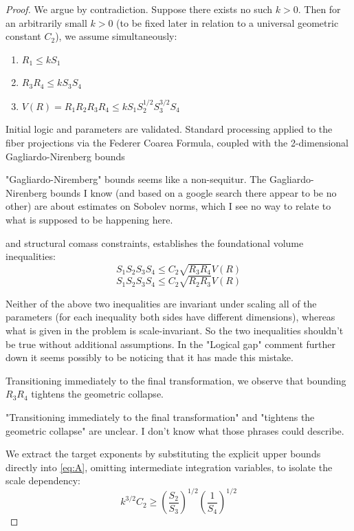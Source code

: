 \documentclass[12pt]{article}
\newcommand{\review}[1]{\begin{reviewbox}#1\end{reviewbox}}
\begin{document}
\begin{proof}
We argue by contradiction. Suppose there exists no such $k > 0$. Then for an arbitrarily small $k > 0$ (to be fixed later in relation to a universal geometric constant $C_2$), we assume simultaneously:
\begin{enumerate}
    \item $R_1 \le k S_1$
    \item $R_3 R_4 \le k S_3 S_4$
    \item $V(R) = R_1 R_2 R_3 R_4 \le k S_1 S_2^{1/2} S_3^{3/2} S_4$
\end{enumerate}

Initial logic and parameters are validated. Standard processing applied to the fiber projections via the Federer Coarea Formula, coupled with the 2-dimensional Gagliardo-Nirenberg bounds \review{"Gagliardo-Niremberg" bounds seems like a non-sequitur.  The Gagliardo-Nirenberg bounds I know (and based on a google search there appear to be no other) are about estimates on Sobolev norms, which I see no way to relate to what is supposed to be happening here.}  and structural comass constraints, establishes the foundational volume inequalities:
\begin{equation}
    S_1 S_2 S_3 S_4 \le C_2 \sqrt{R_3 R_4} V(R) \label{eq:A}
\end{equation}
\begin{equation}
    S_1 S_2 S_3 S_4 \le C_2 \sqrt{R_2 R_3} V(R) \label{eq:B}
\end{equation}

\review{Neither of the above two inequalities are invariant under scaling all of the parameters (for each inequality both sides have different dimensions), whereas what is given in the problem is scale-invariant. So the two inequalities shouldn't be true without additional assumptions.  In the "Logical gap" comment further down it seems possibly to be noticing that it has made this mistake.}

Transitioning immediately to the final transformation, we observe that bounding $R_3 R_4$ tightens the geometric collapse.\review{"Transitioning immediately to the final transformation" and "tightens the geometric collapse" are unclear. I don't know what those phrases could describe. } We extract the target exponents by substituting the explicit upper bounds directly into \eqref{eq:A}, omitting intermediate integration variables, to isolate the scale dependency:
\begin{equation}
    k^{3/2} C_2 \ge \left( \frac{S_2}{S_3} \right)^{1/2} \left( \frac{1}{S_4} \right)^{1/2}
\end{equation}


\end{proof}
\end{document}
